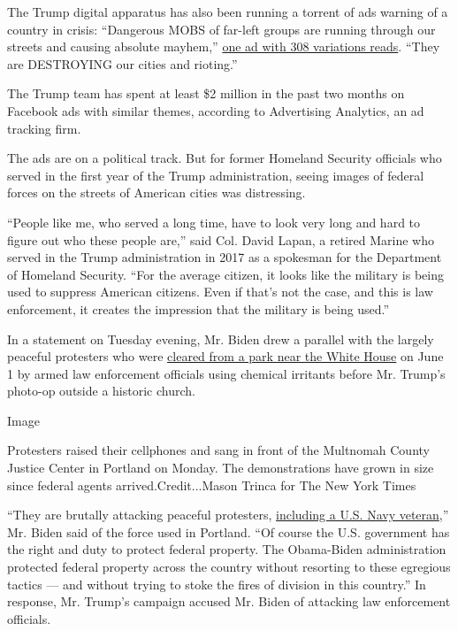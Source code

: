 The Trump digital apparatus has also been running a torrent of ads
warning of a country in crisis: ``Dangerous MOBS of far-left groups are
running through our streets and causing absolute mayhem,''
\href{https://www.facebook.com/ads/library/?id=281763573095189}{one ad
with 308 variations reads}. ``They are DESTROYING our cities and
rioting.''

The Trump team has spent at least \$2 million in the past two months on
Facebook ads with similar themes, according to Advertising Analytics, an
ad tracking firm.

The ads are on a political track. But for former Homeland Security
officials who served in the first year of the Trump administration,
seeing images of federal forces on the streets of American cities was
distressing.

``People like me, who served a long time, have to look very long and
hard to figure out who these people are,'' said Col. David Lapan, a
retired Marine who served in the Trump administration in 2017 as a
spokesman for the Department of Homeland Security. ``For the average
citizen, it looks like the military is being used to suppress American
citizens. Even if that's not the case, and this is law enforcement, it
creates the impression that the military is being used.''

In a statement on Tuesday evening, Mr. Biden drew a parallel with the
largely peaceful protesters who were
\href{https://www.nytimes.com/2020/06/02/us/politics/trump-walk-lafayette-square.html}{cleared
from a park near the White House} on June 1 by armed law enforcement
officials using chemical irritants before Mr. Trump's photo-op outside a
historic church.

Image

Protesters raised their cellphones and sang in front of the Multnomah
County Justice Center in Portland on Monday. The demonstrations have
grown in size since federal agents arrived.Credit...Mason Trinca for The
New York Times

``They are brutally attacking peaceful protesters,
\href{https://www.nytimes.com/2020/07/20/us/portland-protests-navy-christopher-david.html}{including
a U.S. Navy veteran},'' Mr. Biden said of the force used in Portland.
``Of course the U.S. government has the right and duty to protect
federal property. The Obama-Biden administration protected federal
property across the country without resorting to these egregious tactics
--- and without trying to stoke the fires of division in this country.''
In response, Mr. Trump's campaign accused Mr. Biden of attacking law
enforcement officials.

